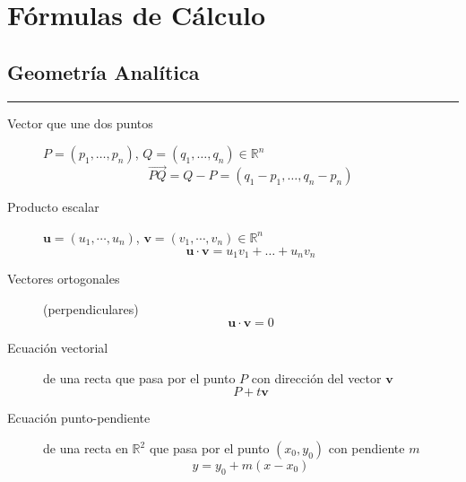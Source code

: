 
\sloppy

\section*{Fórmulas de Cálculo}

\footnotesize
{}

\begin{multicols}{2}
\subsection*{Geometría Analítica}

	\begin{tcolorbox}[hbox, title=Vectores]
		\begin{minipage}{0.4\textwidth}
			\flushleft
			\rule{0.4\textwidth}{0pt}
			\begin{description}
				\item[Vector que une dos puntos] $P=(p_1,\ldots,p_n)$, $Q=(q_1,\ldots,q_n)\in \mathbb{R}^n$
				      \[
					      \vec{PQ} = Q-P = (q_1-p_1,\ldots,q_n-p_n)
				      \]
				\item[Producto escalar] $\mathbf{u}=(u_1,\cdots,u_n)$, $\mathbf{v}=(v_1,\cdots,v_n)\in\mathbb{R}^n$
				      \[
					      \mathbf{u}\cdot \mathbf{v} = u_1v_1 + \ldots + u_nv_n
				      \]
				\item[Vectores ortogonales] (perpendiculares)
				      \[
					      \mathbf{u\cdot v}=0
				      \]
			\end{description}
		\end{minipage}
	\end{tcolorbox}

	\begin{tcolorbox}[hbox, title=Rectas]
		\begin{minipage}{0.4\textwidth}
			\flushleft
			\begin{description}
				\item[Ecuación vectorial] de una recta que pasa por el punto $P$ con dirección del vector $\mathbf{v}$
				      \[
					      P+t\mathbf{v}
				      \]
				\item[Ecuación punto-pendiente] de una recta en $\mathbb{R}^2$ que pasa por el punto $(x_0,y_0)$ con pendiente $m$
				      \[
					      y=y_0+m(x-x_0)
				      \]
			\end{description}
		\end{minipage}
	\end{tcolorbox}


\end{multicols}
